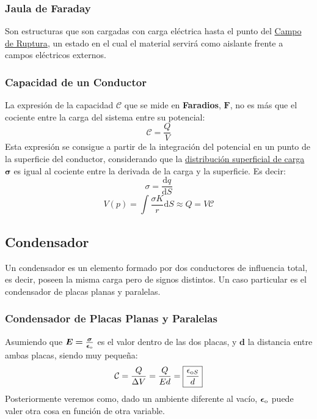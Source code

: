 \subsubsection{Jaula de Faraday}
\noindent Son estructuras que son cargadas con carga eléctrica hasta el punto del \underline{Campo de Ruptura}, un estado en el cual el material servirá como aislante frente a campos eléctricos externos.
\subsubsection{Capacidad de un Conductor}
\noindent La expresión de la capacidad \(\bm{\mathcal{C}}\) que se mide en \textbf{Faradios}, \(\bm{F}\), no es más que el cociente entre la carga del sistema entre su potencial:
\[
        \boxed{\mathcal{C} = \frac{Q}{V}}
\]
Esta expresión se consigue a partir de la integración del potencial en un punto de la superficie del conductor, considerando que la \underline{distribución superficial de carga \(\bm{\sigma}\)} es igual al cociente entre la derivada de la carga y la superficie. Es decir:
\[
        \sigma = \frac{\mathrm{d}q}{\mathrm{d}S}
\]
\[
        V(p) = \int \frac{\sigma K}{r} \mathrm{d}S \approx Q = V \mathcal{C}
\]
\subsection{Condensador}
\noindent Un condensador es un elemento formado por dos conductores de influencia total, es decir, poseen la misma carga pero de signos distintos. Un caso particular es el condensador de placas planas y paralelas.
\newpage
\subsubsection{Condensador de Placas Planas y Paralelas}
\begin{wrapfigure}{l}{0cm}
        
\end{wrapfigure}
\noindent Asumiendo que \(\bm{E = \frac{\sigma}{\epsilon_{\textnormal{o}}}}\) es el valor dentro de las dos placas, y \(\bm{d}\) la distancia entre ambas placas, siendo muy pequeña:
\[
        \mathcal{C}  = \frac{Q}{\Delta V} = \frac{Q}{Ed} = \boxed{\frac{\epsilon_{\textnormal{o}S}}{d}}
\]
Posteriormente veremos como, dado un ambiente diferente al vacío, \(\bm{\epsilon_{\textnormal{o}}}\) puede valer otra cosa en función de otra variable.
